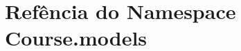 \hypertarget{namespaceCourse_1_1models}{\section{Refência do Namespace Course.\-models}
\label{d6/d2a/namespaceCourse_1_1models}
}
